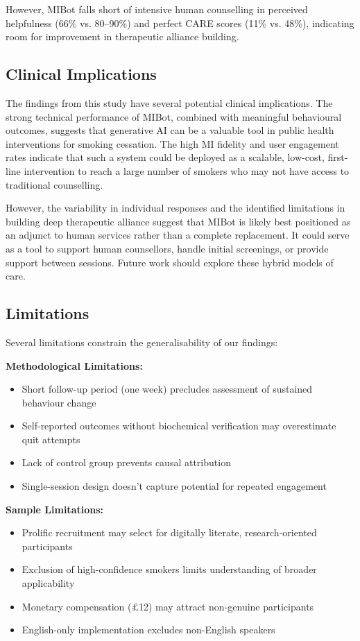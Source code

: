 However, MIBot falls short of intensive human counselling in perceived helpfulness (66\% vs. 80--90\%) and perfect CARE scores (11\% vs. 48\%), indicating room for improvement in therapeutic alliance building.

\subsection*{Clinical Implications}

The findings from this study have several potential clinical implications. The strong technical performance of MIBot, combined with meaningful behavioural outcomes, suggests that generative AI can be a valuable tool in public health interventions for smoking cessation. The high MI fidelity and user engagement rates indicate that such a system could be deployed as a scalable, low-cost, first-line intervention to reach a large number of smokers who may not have access to traditional counselling.

However, the variability in individual responses and the identified limitations in building deep therapeutic alliance suggest that MIBot is likely best positioned as an adjunct to human services rather than a complete replacement. It could serve as a tool to support human counsellors, handle initial screenings, or provide support between sessions. Future work should explore these hybrid models of care.

\subsection*{Limitations}

Several limitations constrain the generalisability of our findings:

\textbf{Methodological Limitations:}
\begin{itemize}
\item Short follow-up period (one week) precludes assessment of sustained behaviour change
\item Self-reported outcomes without biochemical verification may overestimate quit attempts
\item Lack of control group prevents causal attribution
\item Single-session design doesn't capture potential for repeated engagement
\end{itemize}

\textbf{Sample Limitations:}
\begin{itemize}
\item Prolific recruitment may select for digitally literate, research-oriented participants
\item Exclusion of high-confidence smokers limits understanding of broader applicability
\item Monetary compensation ($\pounds$12) may attract non-genuine participants
\item English-only implementation excludes non-English speakers
\end{itemize}

